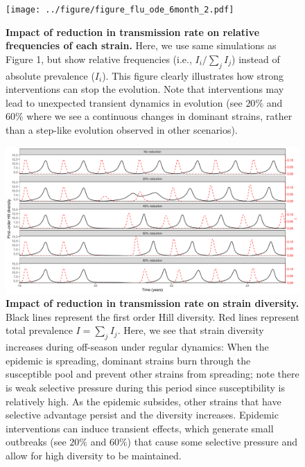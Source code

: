 \documentclass[12pt]{article}
\begin{document}
\pagebreak

\begin{figure}[!h]
\texttt{[image: ../figure/figure\_flu\_ode\_6month\_2.pdf]}
\caption{
\textbf{Impact of reduction in transmission rate on relative frequencies of each strain.}
Here, we use same simulations as Figure 1, but show relative frequencies (i.e., $I_i/\sum_j I_j$) instead of absolute prevalence ($I_i$).
This figure clearly illustrates how strong interventions can stop the evolution.
Note that interventions may lead to unexpected transient dynamics in evolution (see $20\%$ and $60\%$ where we see a continuous changes in dominant strains, rather than a step-like evolution observed in other scenarios).
}
\end{figure}


\pagebreak

\begin{figure}[!h]
\includegraphics[width=\textwidth]{../figure/figure_flu_ode_6month_4.pdf}
\caption{
\textbf{Impact of reduction in transmission rate on strain diversity.}
Black lines represent the first order Hill diversity.
Red lines represent total prevalence $I = \sum_j I_j$.
Here, we see that strain diversity increases during off-season under regular dynamics:
When the epidemic is spreading, dominant strains burn through the susceptible pool and prevent other strains from spreading; note there is weak selective pressure during this period since susceptibility is relatively high.
As the epidemic subsides, other strains that have selective advantage persist and the diversity increases.
Epidemic interventions can induce transient effects, which generate small outbreaks (see $20\%$ and $60\%$) that cause some selective pressure and allow for high diversity to be maintained.
}
\end{figure}


\pagebreak
\end{document}
